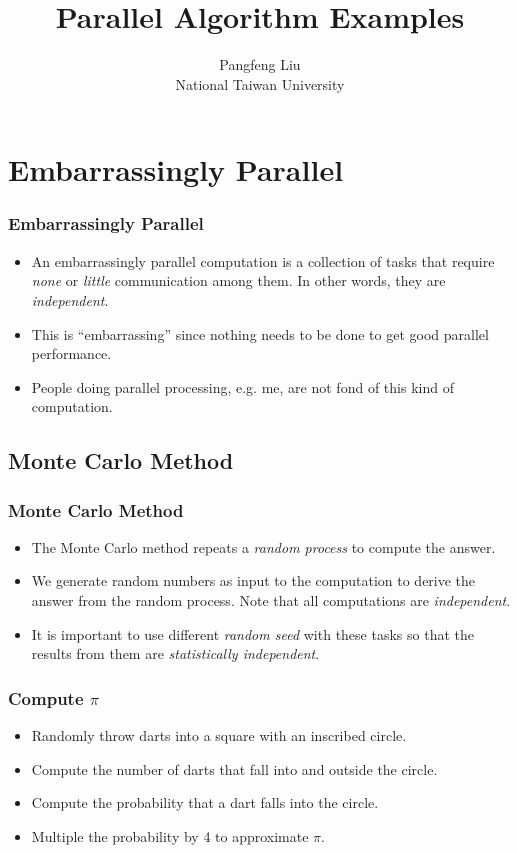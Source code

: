 \documentclass{beamer}
\begin{document}
\begin{CJK}{UTF8}{bsmi}

\title{Parallel Algorithm Examples}

\author{Pangfeng Liu \\ National Taiwan University}

\begin{frame}
\titlepage
\end{frame}


\section{Embarrassingly Parallel}

\begin{frame}
\frametitle{Embarrassingly Parallel}
\begin{itemize}
\item An embarrassingly parallel computation is a collection of tasks
  that require {\em none} or {\em little} communication among them.
  In other words, they are {\em independent}.
\item This is ``embarrassing'' since nothing needs to be done to get
  good parallel performance.
\item People doing parallel processing, e.g. me, are not fond of this
  kind of computation.
\end{itemize}
\end{frame}

\subsection{Monte Carlo Method}

\begin{frame}
\frametitle{Monte Carlo Method}
\begin{itemize}
\item The Monte Carlo method repeats a {\em random process} to compute
  the answer.
\item We generate random numbers as input to the computation to derive the answer from the random process.  
Note that all computations are {\em independent}.
\item It is important to use different {\em random seed} with these tasks so that the results from them are {\em statistically independent}.
\end{itemize}
\end{frame}

\begin{frame}
\frametitle{Compute $\pi$}
\begin{itemize}
\item Randomly throw darts into a square with an inscribed circle.
\item Compute the number of darts that fall into and outside the circle.
\item Compute the probability that a dart falls into the circle.
\item Multiple the probability by 4 to approximate $\pi$.
\end{itemize}
\end{frame}


\end{CJK}
\end{document}
